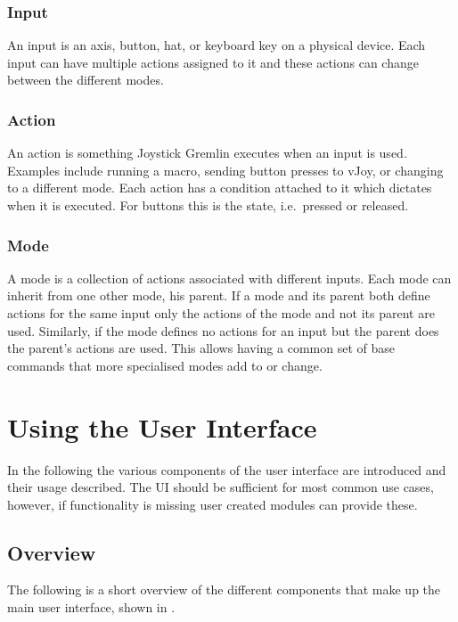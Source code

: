 \documentclass[a4, 10pt]{article}
\newcommand{\JG}{Joystick Gremlin}
\begin{document}
\subsubsection{Input}
An input is an axis, button, hat, or keyboard key on a physical device.
Each input can have multiple actions assigned to it and these actions
can change between the different modes.

\subsubsection{Action}
An action is something \JG{} executes when an input is used. Examples
include running a macro, sending button presses to vJoy, or changing to a
different mode. Each action has a condition attached to it which
dictates when it is executed. For buttons this is the state, i.e.\
pressed or released.

\subsubsection{Mode}
A mode is a collection of actions associated with different inputs.
Each mode can inherit from one other mode, his parent. If a mode and its
parent both define actions for the same input only the actions of the
mode and not its parent are used. Similarly, if the mode defines no
actions for an input but the parent does the parent's actions are used.
This allows having a common set of base commands that more specialised
modes add to or change.



\section{Using the User Interface}
\label{sec:gui}

In the following the various components of the user interface are
introduced and their usage described. The UI should be sufficient for
most common use cases, however, if functionality is missing user created
modules can provide these.


\subsection{Overview}

The following is a short overview of the different components that make
up the main user interface, shown in \figref{main-ui}.
\end{document}
